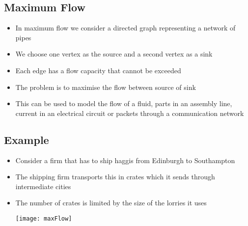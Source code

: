 
\begin{slide}
\section{Maximum Flow}

\begin{PauseHighLight}
  \begin{itemize}
  \item In maximum flow we consider a directed graph representing a
    network of pipes\pause
  \item We choose one vertex as the source and a second vertex as a
    sink\pause
  \item Each edge has a flow capacity that cannot be exceeded\pause
  \item The problem is to maximise the flow between source of sink\pause
  \item This can be used to model the flow of a fluid, parts in an
    assembly line, current in an electrical circuit or packets through a
    communication network\pause
  \end{itemize}
\end{PauseHighLight}

\end{slide}


\begin{slide}
\section[-2]{Example}

\begin{PauseHighLight}
  \begin{itemize}
  \item Consider a firm that has to ship haggis from Edinburgh to
    Southampton\pause
  \item The shipping firm transports this in crates which it sends
    through intermediate cities\pause
  \item The number of crates is limited by the size of the lorries it
    uses\pause
    \begin{center}
      \texttt{[image: maxFlow]}
    \end{center}
  \end{itemize}
\end{PauseHighLight}

\end{slide}


